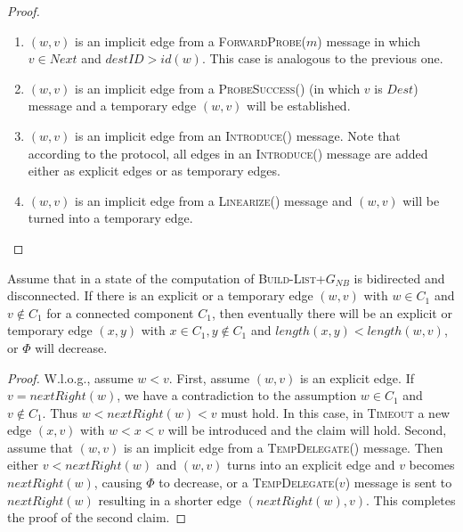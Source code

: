 \documentclass[a4paper,USenglish]{lipics}
\newcommand{\blp}{\textsc{Build-List+}\xspace}
\newcommand{\linearize}[1]{\textsc{Linearize(\ensuremath{#1})}\xspace}
\newcommand{\introduce}[1]{\textsc{Introduce(\ensuremath{#1})}\xspace}
\newcommand{\tempdelegate}[1]{\textsc{TempDelegate(\ensuremath{#1})}\xspace}
\newcommand{\timeout}{\textsc{Timeout}\xspace}
\newcommand{\forwardprobe}[1]{\textsc{ForwardProbe(\ensuremath{#1})}\xspace}
\newcommand{\psuccess}[1]{\textsc{ProbeSuccess(\ensuremath{#1})}\xspace}
\begin{document}
\begin{proof}
\begin{enumerate}
	Note that in this case if a \forwardprobe{m} message is delegated from a node $x$ to a node $y < x$, then a temporary edge $(x,y)$ is also established.
	Then either $y \notin C_1$ directly proving the claim, or $y \in C_1$.
	Observe that each \forwardprobe{m} message can only be delegated from a node $x$ to a node $y < x$ once.
	Thus, either starting from the first or the second step, whenever a \forwardprobe{m} message is delegated from a node $x$ to a node $y$, then $y > x$.
	Furthermore, note that the protocol assures $y \in Right(x)$, i.e., $y \in C_1$ as well.
	The only case when a \forwardprobe{m} message is no longer delegated is if $Next$ is empty (in which there is nothing left to prove), or when $destID = id(x)$ for a node $x$.
	In the latter case, for each node remaining in $Next$, a temporary edge is created.
  \item $(w,v)$ is an implicit edge from a \forwardprobe{m} message in which $v\in Next$ and $destID > id(w)$.
	This case is analogous to the previous one.
  \item $(w,v)$ is an implicit edge from a \psuccess{} (in which $v$ is $Dest$) message and a temporary edge $(w,v)$ will be established.
  \item $(w,v)$ is an implicit edge from an \introduce{} message.
	Note that according to the protocol, all edges in an \introduce{} message are added either as explicit edges or as temporary edges.
  \item $(w,v)$ is an implicit edge from a \linearize{} message and $(w,v)$ will be turned into a temporary edge.
 \end{enumerate} 
\end{proof}
\begin{lemma}\label{lem:temporary_will_shorten_or_phi_will_decrease}
  Assume that in a state of the computation of \blp $G_{NB}$ is bidirected and disconnected.
  If there is an explicit or a temporary edge $(w,v)$ with $w \in C_1$ and $v \notin C_1$ for a connected component $C_1$, then eventually there will be an explicit or temporary edge $(x,y)$ with $x \in C_1, y \notin C_1$ and $length(x,y)<length(w,v)$, or $\Phi$ will decrease.
 \end{lemma}

\begin{proof}
  W.l.o.g., assume $w<v$.
  First, assume $(w,v)$ is an explicit edge. 
  If $v = nextRight(w)$, we have a contradiction to the assumption $w \in C_1$ and $v \notin C_1$.
  Thus $w < nextRight(w) < v$ must hold. 
  In this case, in \timeout a new edge $(x,v)$ with $w < x < v$ will be introduced and the claim will hold.
  Second, assume that $(w,v)$ is an implicit edge from a \tempdelegate{} message. 
  Then either $v < nextRight(w)$ and $(w,v)$ turns into an explicit edge and $v$ becomes $nextRight(w)$, causing $\Phi$ to decrease, or a \tempdelegate{v} message is sent to $nextRight(w)$ resulting in a shorter edge $(nextRight(w),v)$.
  This completes the proof of the second claim.
\end{proof}
\end{document}
